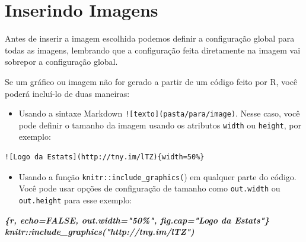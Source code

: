 \documentclass[
]{book}
\newenvironment{Shaded}{\begin{snugshade}}{\end{snugshade}}
\newcommand{\InformationTok}[1]{\textcolor[rgb]{0.56,0.35,0.01}{\textbf{\textit{#1}}}}
\providecommand{\tightlist}{%
  \setlength{\itemsep}{0pt}\setlength{\parskip}{0pt}}
\begin{document}
\hypertarget{inserindo-imagens}{%
\section{Inserindo Imagens}\label{inserindo-imagens}}

Antes de inserir a imagem escolhida podemos definir a configuração global para todas as imagens, lembrando que a configuração feita diretamente na imagem vai sobrepor a configuração global.

\begin{Shaded}
\end{Shaded}

Se um gráfico ou imagem não for gerado a partir de um código feito por R, você poderá incluí-lo de duas maneiras:

\begin{itemize}
\tightlist
\item
  Usando a sintaxe Markdown \texttt{!{[}texto{]}(pasta/para/image)}. Nesse caso, você pode definir o tamanho da imagem usando os atributos \texttt{width} ou \texttt{height}, por exemplo:
\end{itemize}

\begin{verbatim}
![Logo da Estats](http://tny.im/lTZ){width=50%}
\end{verbatim}

\begin{itemize}
\tightlist
\item
  Usando a função \texttt{knitr::include\_graphics(}) em qualquer parte do código. Você pode usar opções de configuração de tamanho como \texttt{out.width} ou \texttt{out.height} para esse exemplo:
\end{itemize}

\begin{Shaded}
\begin{Highlighting}[]
\InformationTok{\textasciigrave{}\textasciigrave{}\textasciigrave{}\{r, echo=FALSE, out.width="50\%", fig.cap="Logo da Estats"\}}
\InformationTok{knitr::include\_graphics("http://tny.im/lTZ")}
\InformationTok{\textasciigrave{}\textasciigrave{}\textasciigrave{}}
\end{Highlighting}
\end{Shaded}
\end{document}
